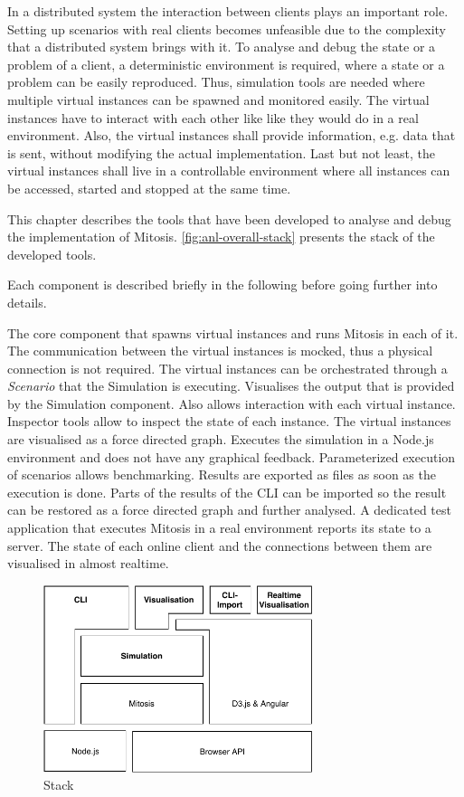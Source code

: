 In a distributed system the interaction between clients plays an important role. Setting up scenarios with real clients becomes unfeasible due to the complexity that a distributed system brings with it. To analyse and debug the state or a problem of a client, a deterministic environment is required, where a state or a problem can be easily reproduced.
Thus, simulation tools are needed where multiple virtual instances can be spawned and monitored easily. The virtual instances have to interact with each other like like they would do in a real environment. Also, the virtual instances shall provide information, e.g. data that is sent, without modifying the actual implementation. Last but not least, the virtual instances shall live in a controllable environment where all instances can be accessed, started and stopped at the same time. 

This chapter describes the tools that have been developed to analyse and debug the implementation of Mitosis. \vref{fig:anl-overall-stack} presents the stack of the developed tools.

Each component is described briefly in the following before going further into details.

\begin{itemize}
     The core component that spawns virtual instances and runs Mitosis in each of it. The communication between the virtual instances is mocked, thus a physical connection is not required. The virtual instances can be orchestrated through a \textit{Scenario} that the Simulation is executing.
     Visualises the output that is provided by the Simulation component. Also allows interaction with each virtual instance. Inspector tools allow to inspect the state of each instance. The virtual instances are visualised as a force directed graph.
     Executes the simulation in a Node.js environment and does not have any graphical feedback. Parameterized execution of scenarios allows benchmarking. Results are exported as files as soon as the execution is done.
     Parts of the results of the CLI can be imported so the result can be restored as a force directed graph and further analysed.
     A dedicated test application that executes Mitosis in a real environment reports its state to a server. The state of each online client and the connections between them are visualised in almost realtime. 
\end{itemize}

\begin{figure}
\centering
\includegraphics[width=0.7\textwidth]{graphics/analysis-tools/analysis-tools.pdf}
\caption{Stack}
\label{fig:anl-overall-stack}
\end{figure}